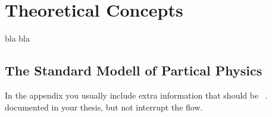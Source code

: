 \chapter{Theoretical Concepts}
\label{sec:SM}
bla bla

\section{The Standard Modell of Partical Physics }
In the appendix you usually include extra information that should be ~\cite{politzer1974asymptotic}.
documented in your thesis, but not interrupt the flow.

